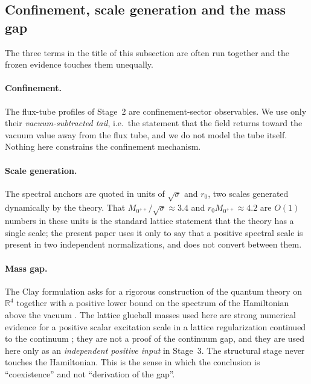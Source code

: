 \documentclass[11pt,a4paper]{article}
\theoremstyle{definition}
\theoremstyle{remark}
\newcommand{\sqs}{\sqrt{\sigma}}
\begin{document}
\subsection{Confinement, scale generation and the mass gap}\label{ssec:confinement}
The three terms in the title of this subsection are often run together and the frozen evidence touches them unequally.

\paragraph{Confinement.} The flux-tube profiles of Stage~2 are confinement-sector observables. We use only their \emph{vacuum-subtracted tail}, i.e.\ the statement that the field returns toward the vacuum value away from the flux tube, and we do not model the tube itself. Nothing here constrains the confinement mechanism.

\paragraph{Scale generation.} The spectral anchors are quoted in units of $\sqrt\sigma$ and $r_0$, two scales generated dynamically by the theory. That $M_{0^{++}}/\sqs\approx3.4$ and $r_0M_{0^{++}}\approx4.2$ are $O(1)$ numbers in these units is the standard lattice statement that the theory has a single scale; the present paper uses it only to say that a positive spectral scale is present in two independent normalizations, and does not convert between them.

\paragraph{Mass gap.} The Clay formulation asks for a rigorous construction of the quantum theory on $\mathbb R^4$ together with a positive lower bound on the spectrum of the Hamiltonian above the vacuum \cite{JaffeWitten}. The lattice glueball masses used here are strong numerical evidence for a positive scalar excitation scale in a lattice regularization continued to the continuum \cite{Teper98,MorningstarPeardon99,Chen06,LuciniTeperWenger04,AT20}; they are not a proof of the continuum gap, and they are used here only as an \emph{independent positive input} in Stage~3. The structural stage never touches the Hamiltonian. This is the sense in which the conclusion is ``coexistence'' and not ``derivation of the gap''.
\end{document}
